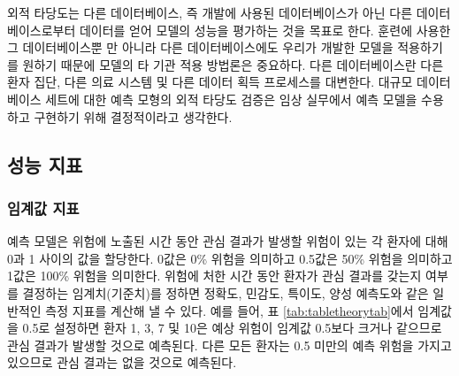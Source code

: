 \documentclass[11pt]{book}
\theoremstyle{definition}
\theoremstyle{definition}
\theoremstyle{definition}
\theoremstyle{remark}
\begin{document}
외적 타당도는 다른 데이터베이스, 즉 개발에 사용된 데이터베이스가 아닌
다른 데이터베이스로부터 데이터를 얻어 모델의 성능을 평가하는 것을 목표로
한다. 훈련에 사용한 그 데이터베이스뿐 만 아니라 다른 데이터베이스에도
우리가 개발한 모델을 적용하기를 원하기 때문에 모델의 타 기관 적용
방법론은 중요하다. 다른 데이터베이스란 다른 환자 집단, 다른 의료 시스템
및 다른 데이터 획득 프로세스를 대변한다. 대규모 데이터베이스 세트에 대한
예측 모형의 외적 타당도 검증은 임상 실무에서 예측 모델을 수용하고
구현하기 위해 결정적이라고 생각한다.

\subsection{성능 지표}\label{performance}

\subsubsection*{임계값 지표}\label{-}

예측 모델은 위험에 노출된 시간 동안 관심 결과가 발생할 위험이 있는 각
환자에 대해 0과 1 사이의 값을 할당한다. 0값은 0\% 위험을 의미하고
0.5값은 50\% 위험을 의미하고 1값은 100\% 위험을 의미한다. 위험에 처한
시간 동안 환자가 관심 결과를 갖는지 여부를 결정하는 임계치(기준치)를
정하면 정확도, 민감도, 특이도, 양성 예측도와 같은 일반적인 측정 지표를
계산해 낼 수 있다. 예를 들어, 표 \ref{tab:tabletheorytab}에서 임계값을
0.5로 설정하면 환자 1, 3, 7 및 10은 예상 위험이 임계값 0.5보다 크거나
같으므로 관심 결과가 발생할 것으로 예측된다. 다른 모든 환자는 0.5 미만의
예측 위험을 가지고 있으므로 관심 결과는 없을 것으로 예측된다.
  
 
\end{document}

